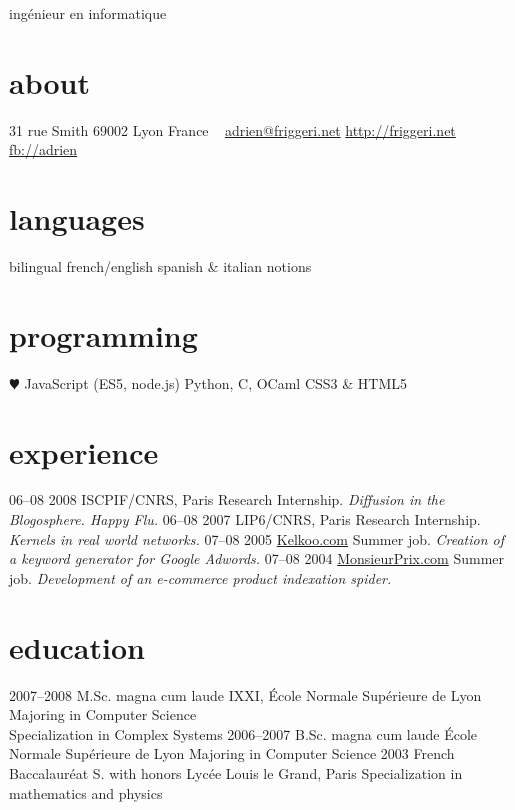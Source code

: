 \documentclass[]{friggeri-cv}
\begin{document}
{ingénieur en informatique}

\begin{aside}
    \section{about}
    31 rue Smith
    69002 Lyon
    France
    ~
    \href{mailto:adrien@friggeri.net}{adrien@friggeri.net}
    \href{http://friggeri.net}{http://friggeri.net}
    \href{http://facebook.com/adrien}{fb://adrien}
    \section{languages}
    bilingual french/english
    spanish \& italian notions
    \section{programming}
    {\color{red} $\varheartsuit$} JavaScript
    (ES5, node.js)
    Python, C, OCaml
    CSS3 \& HTML5
\end{aside}


\section{experience}

\begin{entrylist}
	\entry
	{06–08 2008}
	{ISCPIF/CNRS, Paris}
	{Research Internship.}
	{\emph{Diffusion in the Blogosphere. Happy Flu.}}
	\entry
	{06–08 2007}
	{LIP6/CNRS, Paris}
	{Research Internship.}
	{\emph{Kernels in real world networks.}}
	\entry
	{07–08 2005}
	{\href{http://www.kelkoo.com}{Kelkoo.com}}
	{Summer job.}
	{\emph{Creation of a keyword generator for Google Adwords.}}
	\entry
	{07–08 2004}
	{\href{http://www.monsieurprix.com}{MonsieurPrix.com}}
	{Summer job.}
	{\emph{Development of an e-commerce product indexation spider.}}
\end{entrylist}

\section{education}

\begin{entrylist}
    \entry
    {2007–2008}
    {M.Sc. magna cum laude}
    {IXXI, École Normale Supérieure de Lyon}
    {Majoring in Computer Science\\
    Specialization in Complex Systems}
    \entry
    {2006–2007}
    {B.Sc. magna cum laude}
    {École Normale Supérieure de Lyon}
    {Majoring in Computer Science}
    \entry
    {2003}
    {French Baccalauréat S. with honors}
    {Lycée Louis le Grand, Paris}
    {Specialization in mathematics and physics}
\end{entrylist}
\end{document}
